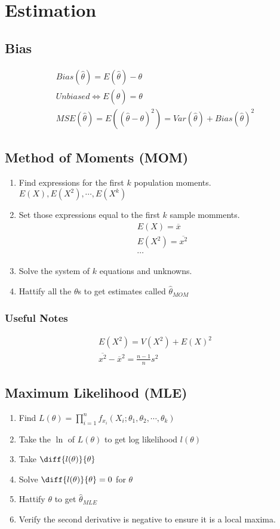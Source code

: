 \section{Estimation}
\subsection{Bias}
\begin{align}
  Bias(\hat{\theta}) = E(\hat{\theta}) - \theta \\
  Unbiased \iff E(\hat{\theta}) = \theta \\
  MSE(\hat{\theta}) = E((\hat{\theta} - \theta)^2) = Var(\hat{\theta}) + Bias(\hat{\theta})^2
\end{align}

\subsection{Method of Moments (MOM)}
\begin{enumerate}
\item Find expressions for the first $k$ population moments. $E(X), E(X^2), \cdots, E(X^k)$
\item Set those expressions equal to the first $k$ sample momments.
  \begin{align}
    E(X) = \overbar{x} \\
    E(X^2) = \overbar{x^2} \\
    \cdots
  \end{align}
\item Solve the system of $k$ equations and unknowns.
\item Hattify all the $\theta$s to get estimates called $\hat{\theta}_{MOM}$
\end{enumerate}

\subsubsection{Useful Notes}
\begin{align}
  E(X^2) = V(X^2) + E(X)^2 \\
  \overbar{x^2} - \overbar{x}^2 = \frac{n - 1}{n}s^2
\end{align}

\subsection{Maximum Likelihood (MLE)}
\begin{enumerate}
\item Find $L(\theta) = \prod_{i=1}^n f_{x_i}(X_i; \theta_1, \theta_2, \cdots, \theta_k)$
\item Take the $\ln$ of $L(\theta)$ to get log likelihood $l(\theta)$
\item Take $\diff{l(\theta)}{\theta}$
\item Solve $\diff{l(\theta)}{\theta} = 0$ for $\theta$
\item Hattify $\theta$ to get $\hat{\theta}_{MLE}$
\item Verify the second derivative is negative to ensure it is a local maxima.
\end{enumerate}

